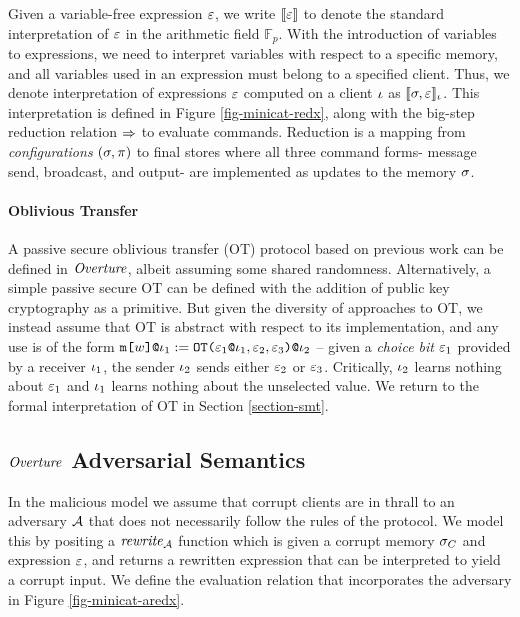 Given a variable-free expression $\varepsilon$, we write $\llbracket \varepsilon \rrbracket$ to denote
the standard interpretation of $\varepsilon$ in the arithmetic field
$\mathbb{F}_{p}$. With the introduction of variables to expressions,
we need to interpret variables with respect to a specific memory, and
all variables used in an expression must belong to a specified client.
Thus, we denote interpretation of expressions $\varepsilon$ computed on a
client $\iota$ as $\llbracket \sigma,\varepsilon \rrbracket_{\iota}$. This interpretation is
defined in Figure \ref{fig-minicat-redx}, along with the big-step
reduction relation $\Rightarrow$ to evaluate commands. Reduction is a mapping
from \emph{configurations} $(\sigma,\pi)$ to final stores
where all three command forms- message send, broadcast, and
output- are implemented as updates to the memory $\sigma$. 


\paragraph{Oblivious Transfer} A passive secure oblivious transfer (OT) protocol
based on previous work \cite{barthe2019probabilistic} can be defined
in $\mathit{Overture}$, albeit assuming some shared randomness. Alternatively,
a simple passive secure OT can be defined with the addition of public
key cryptography as a primitive. But given the diversity of approaches
to OT, we instead assume that OT is abstract with respect to its
implementation, and any use is of the form
$\texttt{m[}w\texttt{]}\texttt{@}\iota_1 := \texttt{OT(}\varepsilon_1\texttt{@}\iota_1,\varepsilon_2,\varepsilon_3 \texttt{)}\texttt{@}\iota_2$ --
given a \emph{choice bit} $\varepsilon_1$ provided by a receiver $\iota_1$, the
sender $\iota_2$ sends either $\varepsilon_2$
or $\varepsilon_3$.  Critically, $\iota_2$ learns nothing about $\varepsilon_1$ and
$\iota_1$ learns nothing about the unselected value. We return to
the formal interpretation of OT in Section \ref{section-smt}.

\subsection{$\mathit{Overture}$ Adversarial Semantics}
  
\minicataredxfig

In the malicious model we assume that corrupt clients are in
thrall to an adversary $\mathcal{A}$ that does not necessarily follow
the rules of the protocol.  We model this by positing a $\mathit{rewrite}_{\mathcal{A}}$
function which is given a corrupt memory $\sigma_C$ and expression
$\varepsilon$, and returns a rewritten expression that can be interpreted to
yield a corrupt input. We define the evaluation relation that
incorporates the adversary in Figure \ref{fig-minicat-aredx}.

